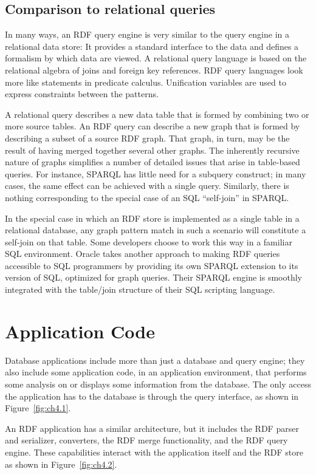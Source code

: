 \subsection{Comparison to relational queries}

In many ways, an RDF query engine is very similar to the query engine in
a relational data store: It provides a standard interface to the data
and defines a formalism by which data are viewed. A relational query
language is based on the relational algebra of joins and foreign key
references. RDF query languages look more like statements in predicate
calculus. Unification variables are used to express constraints between
the patterns.

A relational query describes a new data table that is formed by
combining two or more source tables. An RDF query can describe a new
graph that is formed by describing a subset of a source RDF graph. That
graph, in turn, may be the result of having merged together several
other graphs. The inherently recursive nature of graphs simplifies a
number of detailed issues that arise in table-based queries. For
instance, SPARQL has little need for a subquery construct; in many
cases, the same effect can be achieved with a single query. Similarly,
there is nothing corresponding to the special case of an SQL
``self-join'' in SPARQL.

In the special case in which an RDF store is implemented as a single
table in a relational database, any graph pattern match in such a
scenario will constitute a self-join on that table. Some developers
choose to work this way in a familiar SQL environment. Oracle takes
another approach to making RDF queries accessible to SQL programmers by
providing its own SPARQL extension to its version of SQL, optimized for
graph queries. Their SPARQL engine is smoothly integrated with the
table/join structure of their SQL scripting language.

\section{Application Code}

Database applications include more than just a database and query
engine; they also include some application code, in an application
environment, that performs some analysis on or displays some information
from the database. The only access the application has to the database
is through the query interface, as shown in Figure~\ref{fig:ch4.1}.

An RDF application has a similar architecture, but it includes the RDF
parser and serializer, converters, the RDF merge functionality, and the
RDF query engine. These capabilities interact with the application
itself and the RDF store as shown in Figure~\ref{fig:ch4.2}.

